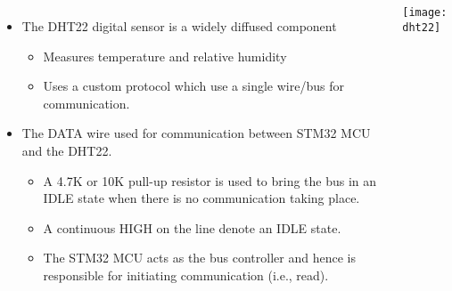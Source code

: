 \documentclass[aspectratio=169]{beamer}
\begin{document}
\begin{frame}{}
\begin{columns}

\begin{itemize}

\item The DHT22 digital sensor is a widely diffused component

\begin{itemize}

\item Measures temperature and relative humidity

\item Uses a custom protocol which use a single wire/bus for communication. 

\end{itemize}

\item The DATA wire used for communication between STM32 MCU and the DHT22.

\begin{itemize}

\item A 4.7K or 10K pull-up resistor is used to bring the bus in an IDLE state when there is no communication taking place.

\item  A continuous HIGH on the line denote an IDLE state.

\item The STM32 MCU acts as the bus controller and hence is responsible for initiating communication (i.e., read).

\end{itemize}

\end{itemize}

\centering
\texttt{[image: dht22]}
\vspace{1cm}

\end{columns}
\end{frame}
\end{document}
